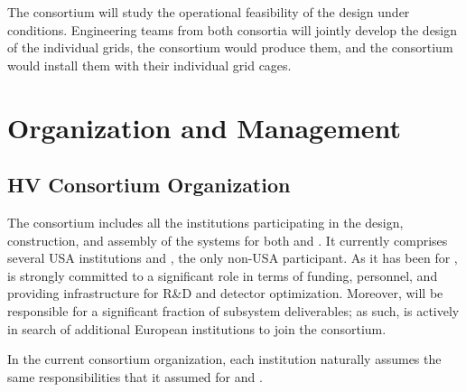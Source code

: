 The   consortium will study the  operational feasibility of the design %
under  conditions.  Engineering teams from both consortia will jointly develop the design of the individual grids, the %
 consortium would produce them, and the  consortium would install them  %
with their individual grid cages. %


\section{Organization and Management}
\label{sec:fddp-hv-org}

\subsection{HV Consortium Organization}
\label{sec:fddp-hv-org-consortium}

The  consortium includes %
all the institutions participating in the design, construction, and assembly of the  systems for both   and . 
It currently comprises several USA institutions and , %
the only non-USA participant. As it has been for ,  is %
strongly committed to a significant role in terms of funding, personnel, 
 and providing infrastructure for R\&D and detector optimization. Moreover,  will be responsible for a significant fraction of subsystem deliverables; as such,   is actively in search of additional European institutions to join the consortium. 
 
 In the current  consortium organization, each institution naturally assumes the same responsibilities that it assumed for  and .

